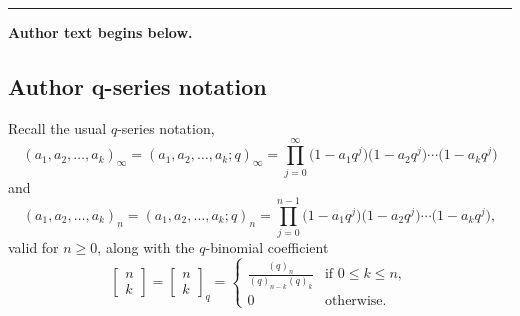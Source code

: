 \documentclass[11pt]{article}
\numberwithin{equation}{section}
\numberwithin{equation}{section}
\begin{document}
\medskip\hrule\medskip\noindent\textbf{Author text begins below.}\par
\setcounter{section}{1}\subsection*{Author q-series notation}
Recall the usual $q$-series notation,
\begin{equation*}
	(a_1,a_2,\dots ,a_k)_{\infty} = (a_1,a_2,\dots ,a_k;q)_{\infty} = \prod_{j=0}^{\infty} \bigl(1-a_1q^j\bigr)\bigl(1-a_2q^j\bigr) \cdots \bigl(1-a_kq^j\bigr)
\end{equation*}
and
\begin{equation*}
	(a_1,a_2,\dots ,a_k)_n = (a_1,a_2,\dots ,a_k;q)_n = \prod_{j=0}^{n-1} \bigl(1-a_1q^j\bigr)\bigl(1-a_2q^j\bigr) \cdots \bigl(1-a_kq^j\bigr),
\end{equation*}
valid for $n \geq 0$, along with the $q$-binomial coefficient
\begin{equation} \label{eqn:qbinom}
	\begin{bmatrix} n \\ k \end{bmatrix} = \begin{bmatrix} n \\ k \end{bmatrix}_q =
	\begin{cases}
		\displaystyle\frac{(q)_n}{(q)_{n-k}(q)_k} & \text{if $0 \leq k \leq n$}, \\
		0 & \text{otherwise}.
	\end{cases}
\end{equation}
\end{document}
